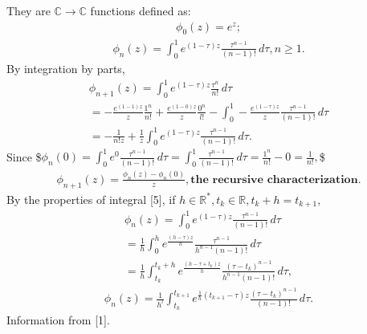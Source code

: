 \documentclass[letterpaper,10pt,english]{jupyterBook}
\begin{document}
\sphinxAtStartPar
They are \(\mathbb{C} \rightarrow \mathbb{C}\) functions defined as:
\begin{equation*}
\begin{split}
  \phi_0 (z) = e^z;
\end{split}
\end{equation*}\begin{equation*}
\begin{split}
  \phi_n (z) = \int_{0}^{1} e^{(1-\tau)z} \frac{\tau^{n-1}}{(n-1)!} \,d\tau, n \geq 1.
\end{split}
\end{equation*}
\sphinxAtStartPar
By integration by parts,
\begin{equation*}
\begin{split}
  \phi_{n+1} (z) = \int_{0}^{1} e^{(1-\tau)z} \frac{\tau^n}{n!} \,d\tau \\
  = - \frac{e^{(1-1)z}}{z} \frac{1^n}{n!} + \frac{e^{(1-0)z}}{z} \frac{0^n}{l!} - \int_{0}^{1} -\frac{e^{(1-\tau)z}}{z} \frac{\tau^{n-1}}{(n-1)!} \,d\tau \\
  = - \frac{1}{n!z} + \frac{1}{z}\int_{0}^{1} e^{(1-\tau)z} \frac{\tau^{n-1}}{(n-1)!} \,d\tau.
\end{split}
\end{equation*}
\sphinxAtStartPar
Since
\$\(
  \phi_n(0) = \int_{0}^{1} e^0 \frac{\tau^{n-1}}{(n-1)!} \,d\tau = \int_{0}^{1} \frac{\tau^{n-1}}{(n-1)!} \,d\tau = \frac{1^n}{n!} - 0 = \frac{1}{n!},
\)\$
\begin{equation*}
\begin{split}
  \phi_{n+1}(z) = \frac{\phi_n(z) - \phi_n(0)}{z}, \textbf{the recursive characterization}.
\end{split}
\end{equation*}
\sphinxAtStartPar
By the properties of integral {[}5{]}, if \(h \in \mathbb{R}^*, t_k \in \mathbb{R}, t_k+h = t_{k+1},\)
\begin{equation*}
\begin{split}
  \phi_n (z) = \int_{0}^{1} e^{(1-\tau)z} \frac{\tau^{n-1}}{(n-1)!} \,d\tau \\
  = \frac{1}{h}\int_{0}^{h} e^{\frac{(h-\tau)z}{h}} \frac{\tau^{n-1}}{h^{n-1}(n-1)!} \,d\tau \\
  = \frac{1}{h}\int_{t_k}^{t_k + h} e^{\frac{(h-\tau+t_k)z}{h}} \frac{(\tau - t_k)^{n-1}}{h^{n-1}(n-1)!} \,d\tau,
\end{split}
\end{equation*}\begin{equation*}
\begin{split}
  \phi_n (z) = \frac{1}{h^l}\int_{t_k}^{t_{k+1}} e^{\frac{1}{h}(t_{k+1}-\tau)z} \frac{(\tau - t_k)^{n-1}}{(n-1)!} \,d\tau.
\end{split}
\end{equation*}
\sphinxAtStartPar
Information from {[}1{]}.
\end{document}
